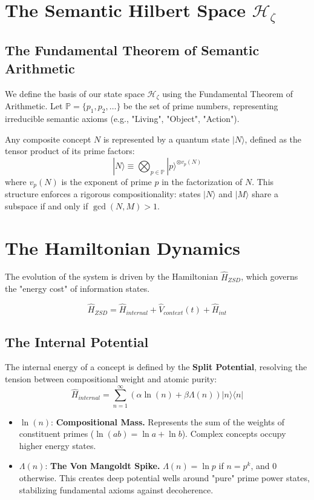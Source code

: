 \documentclass[11pt, a4paper]{article}
\begin{document}
\section{The Semantic Hilbert Space $\mathcal{H}_\zeta$}

\subsection{The Fundamental Theorem of Semantic Arithmetic}
We define the basis of our state space $\mathcal{H}_\zeta$ using the Fundamental Theorem of Arithmetic. Let $\mathbb{P} = \{p_1, p_2, \dots \}$ be the set of prime numbers, representing irreducible semantic axioms (e.g., "Living", "Object", "Action").

Any composite concept $N$ is represented by a quantum state $|N\rangle$, defined as the tensor product of its prime factors:
\begin{equation}
    |N\rangle \equiv \bigotimes_{p \in \mathbb{P}} |p\rangle^{\otimes v_p(N)}
\end{equation}
where $v_p(N)$ is the exponent of prime $p$ in the factorization of $N$. This structure enforces a rigorous compositionality: states $|N\rangle$ and $|M\rangle$ share a subspace if and only if $\gcd(N, M) > 1$.

\section{The Hamiltonian Dynamics}

The evolution of the system is driven by the Hamiltonian $\hat{H}_{ZSD}$, which governs the "energy cost" of information states.

\begin{equation}
    \hat{H}_{ZSD} = \hat{H}_{internal} + \hat{V}_{context}(t) + \hat{H}_{int}
\end{equation}

\subsection{The Internal Potential}
The internal energy of a concept is defined by the \textbf{Split Potential}, resolving the tension between compositional weight and atomic purity:
\begin{equation}
    \hat{H}_{internal} = \sum_{n=1}^{\infty} \left( \alpha \ln(n) + \beta \Lambda(n) \right) |n\rangle\langle n|
\end{equation}
\begin{itemize}
    \item $\ln(n)$: \textbf{Compositional Mass.} Represents the sum of the weights of constituent primes ($\ln(ab) = \ln a + \ln b$). Complex concepts occupy higher energy states.
    \item $\Lambda(n)$: \textbf{The Von Mangoldt Spike.} $\Lambda(n) = \ln p$ if $n=p^k$, and $0$ otherwise. This creates deep potential wells around "pure" prime power states, stabilizing fundamental axioms against decoherence.
\end{itemize}
\end{document}
